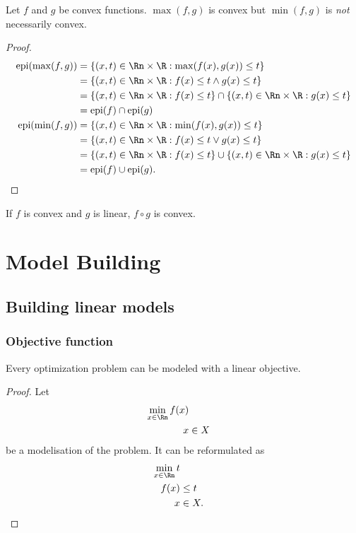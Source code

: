 \begin{myprop}
  Let $f$ and $g$ be convex functions.
  $\max(f,g)$ is convex but $\min(f,g)$ is \emph{not} necessarily convex.
  \begin{proof}
    \begin{align*}
      \epi(\max(f,g))
      & = \{(x,t) \in \Rn \times \R : \max(f(x),g(x)) \leq t\}\\
      & = \{(x,t) \in \Rn \times \R : f(x) \leq t \land g(x) \leq t\}\\
      & = \{(x,t) \in \Rn \times \R : f(x) \leq t\} \cap \{(x,t) \in \Rn \times \R : g(x) \leq t\}\\
      & = \epi(f) \cap \epi(g)\\
      \epi(\min(f,g))
      & = \{(x,t) \in \Rn \times \R : \min(f(x),g(x)) \leq t\}\\
      & = \{(x,t) \in \Rn \times \R : f(x) \leq t \lor g(x) \leq t\}\\
      & = \{(x,t) \in \Rn \times \R : f(x) \leq t\} \cup \{(x,t) \in \Rn \times \R : g(x) \leq t\}\\
      & = \epi(f) \cup \epi(g).
    \end{align*}
  \end{proof}
\end{myprop}

\begin{myprop}
  If $f$ is convex and $g$ is linear, $f \circ g$ is convex.
\end{myprop}

\section{Model Building}
\subsection{Building linear models}
\subsubsection{Objective function}
\begin{myprop}
  \label{prop:linobj}
  Every optimization problem can be modeled with a linear objective.
  \begin{proof}
    Let
    \begin{align*}
      \min_{x \in \Rn} f(x)\\
      x & \in X
    \end{align*}
    be a modelisation of the problem.
    It can be reformulated as
    \begin{align*}
      \min_{x \in \Rn} t\\
      f(x) & \leq t\\
      x & \in X.
    \end{align*}
  \end{proof}
\end{myprop}


